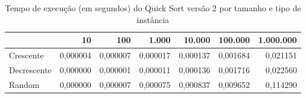 \begin{table}[htbp]
    \centering
    \begin{tabular}{|l|r|r|r|r|r|r|}
        \hline
         & 10 & 100 & 1.000 & 10.000 & 100.000 & 1.000.000 \\
        \hline
        Crescente & 0,000004 & 0,000007 & 0,000017 & 0,000137 & 0,001684 & 0,021151 \\
        \hline
        Decrescente & 0,000000 & 0,000001 & 0,000011 & 0,000136 & 0,001716 & 0,022560 \\
        \hline
        Random & 0,000000 & 0,000007 & 0,000075 & 0,000837 & 0,009652 & 0,114290 \\
        \hline
    \end{tabular}
    \caption{Tempo de execução (em segundos) do Quick Sort versão 2 por tamanho e tipo de instância}
    \label{tab:tempos_quick_v2}
\end{table}
